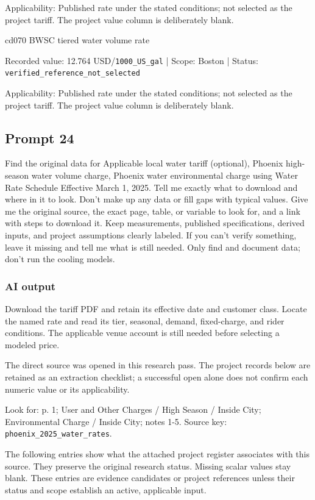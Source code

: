 Applicability: Published rate under the stated conditions; not selected as the project tariff. The project value column is deliberately blank.

cd070  BWSC tiered water volume rate

Recorded value: 12.764 USD/\nolinkurl{1000_US_gal} | Scope: Boston | Status: \nolinkurl{verified_reference_not_selected}

Applicability: Published rate under the stated conditions; not selected as the project tariff. The project value column is deliberately blank.

\subsection*{Prompt 24}
Find the original data for Applicable local water tariff (optional), Phoenix high-season water volume charge, Phoenix water environmental charge using Water Rate Schedule Effective March 1, 2025. Tell me exactly what to download and where in it to look. Don’t make up any data or fill gaps with typical values. Give me the original source, the exact page, table, or variable to look for, and a link with steps to download it. Keep measurements, published specifications, derived inputs, and project assumptions clearly labeled. If you can’t verify something, leave it missing and tell me what is still needed. Only find and document data; don’t run the cooling models.

\subsubsection*{AI output}
Download the tariff PDF and retain its effective date and customer class. Locate the named rate and read its tier, seasonal, demand, fixed-charge, and rider conditions. The applicable venue account is still needed before selecting a modeled price.

The direct source was opened in this research pass. The project records below are retained as an extraction checklist; a successful open alone does not confirm each numeric value or its applicability.

Look for: p. 1; User and Other Charges / High Season / Inside City; Environmental Charge / Inside City; notes 1-5. Source key: \nolinkurl{phoenix_2025_water_rates}.

The following entries show what the attached project register associates with this source. They preserve the original research status. Missing scalar values stay blank. These entries are evidence candidates or project references unless their status and scope establish an active, applicable input.

